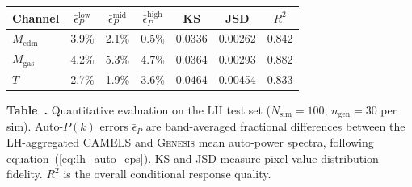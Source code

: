 \begingroup
  \centering
  \label{tab:lh_metrics}
  \begin{tabular}{lcccccc}
    \hline\hline
    Channel & $\bar{\epsilon}_P^{\mathrm{low}}$ & $\bar{\epsilon}_P^{\mathrm{mid}}$ & $\bar{\epsilon}_P^{\mathrm{high}}$ & KS & JSD & $R^2$ \\
    \hline
    $M_{\mathrm{cdm}}$ & 3.9\% & 2.1\% & 0.5\% & 0.0336 & 0.00262 & 0.842 \\
    $M_{\mathrm{gas}}$ & 4.2\% & 5.3\% & 4.7\% & 0.0364 & 0.00293 & 0.882 \\
    $T$ & 2.7\% & 1.9\% & 3.6\% & 0.0464 & 0.00454 & 0.833 \\
    \hline
  \end{tabular}
  \par\smallskip
  \parbox{\columnwidth}{\small
    \textbf{Table~\thetable.} Quantitative evaluation on the LH test set
    ($N_{\mathrm{sim}}=100$, $n_{\mathrm{gen}}=30$ per sim).
    Auto-$P(k)$ errors $\bar{\epsilon}_P$ are band-averaged fractional
    differences between the LH-aggregated CAMELS and \textsc{Genesis}
    mean auto-power spectra, following equation~(\ref{eq:lh_auto_eps}).
    KS and JSD measure pixel-value distribution fidelity. $R^2$ is the
    overall conditional response quality.}
\endgroup
